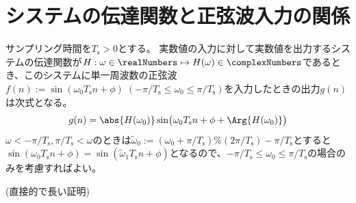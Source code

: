 			\section{システムの伝達関数と正弦波入力の関係}
				\newcommand{\Ts}{T_\text{s}}
				\begin{shadebox}
					サンプリング時間を$\Ts>0$とする。
					実数値の入力に対して実数値を出力するシステムの伝達関数が$H:\omega\in\realNumbers\mapsto H(\omega)\in\complexNumbers$であるとき、このシステムに単一周波数の正弦波$f(n) := \sin(\omega_0 \Ts n + \phi)\;(-\pi/\Ts\leq\omega_0\leq\pi/\Ts)$を入力したときの出力$g(n)$は次式となる。
					\[ g(n) = \abs{H(\omega_0)}\sin\bigl(\omega_0 \Ts n + \phi + \Arg{H(\omega_0)}\bigr) \]
					$\omega<-\pi/\Ts, \pi/\Ts<\omega$のときは$\tilde{\omega}_0 := (\omega_0+\pi/\Ts)\%(2\pi/\Ts)-\pi/\Ts$とすると$\sin(\omega_0 \Ts n + \phi) = \sin(\tilde{\omega}_1 \Ts n + \phi)$となるので、$-\pi/\Ts\leq\omega_0\leq\pi/\Ts$の場合のみを考慮すればよい。
				\end{shadebox}
				(直接的で長い証明)

